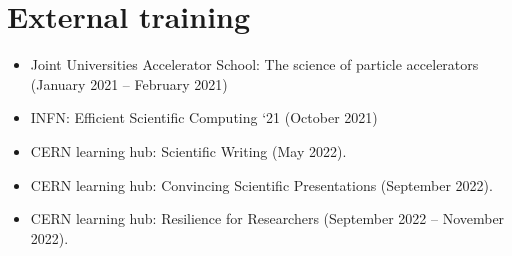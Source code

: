 \section*{External training}

\begin{itemize}
    \item Joint Universities Accelerator School: The science of particle accelerators (January 2021 -- February 2021)
    \item INFN: Efficient Scientific Computing `21 (October 2021)
    \item CERN learning hub:  Scientific Writing (May 2022).
    \item CERN learning hub:  Convincing Scientific Presentations (September 2022).
    \item CERN learning hub:  Resilience for Researchers (September 2022 -- November 2022).
    
\end{itemize}